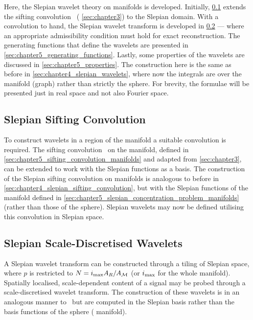 Here, the Slepian wavelet theory on manifolds is developed.
Initially, \cref{sec:chapter5_slepian_sifting_convolution} extends the sifting convolution~\cite{Roddy2021} (\cf{} \cref{sec:chapter3}) to the Slepian domain.
With a convolution to hand, the Slepian wavelet transform is developed in \cref{sec:chapter5_slepian_scale_discretised_wavelets} --- where an appropriate admissibility condition must hold for exact reconstruction.
The generating functions that define the wavelets are presented in \cref{sec:chapter5_generating_functions}.
Lastly, some properties of the wavelets are discussed in \cref{sec:chapter5_properties}.
The construction here is the same as before in \cref{sec:chapter4_slepian_wavelets}, where now the integrals are over the manifold (graph) rather than strictly the sphere.
For brevity, the formulae will be presented just in real space and not also Fourier space.

\subsection{Slepian Sifting Convolution}\label{sec:chapter5_slepian_sifting_convolution}

To construct wavelets in a region of the manifold a suitable convolution is required.
The sifting convolution~\cite{Roddy2021} on the manifold, defined in \cref{sec:chapter5_sifting_convolution_manifolds} and adapted from \cref{sec:chapter3}, can be extended to work with the Slepian functions as a basis.
The construction of the Slepian sifting convolution on manifolds is analogous to before in \cref{sec:chapter4_slepian_sifting_convolution}, but with the Slepian functions of the manifold defined in \cref{sec:chapter5_slepian_concentration_problem_manifolds} (rather than those of the sphere).
Slepian wavelets may now be defined utilising this convolution in Slepian space.

\subsection{Slepian Scale-Discretised Wavelets}\label{sec:chapter5_slepian_scale_discretised_wavelets}

A Slepian wavelet transform can be constructed through a tiling of Slepian space, where \(p\) is restricted to \(N=i_{\text{max}} A_{R}/A_{\mathcal{M}}\) (or \(i_{\text{max}}{}\) for the whole manifold).
Spatially localised, scale-dependent content of a signal may be probed through a scale-discretised wavelet transform.
The construction of these wavelets is in an analogous manner to~\cite{Wiaux2008,McEwen2018} but are computed in the Slepian basis rather than the basis functions of the sphere (\cf{} manifold).

